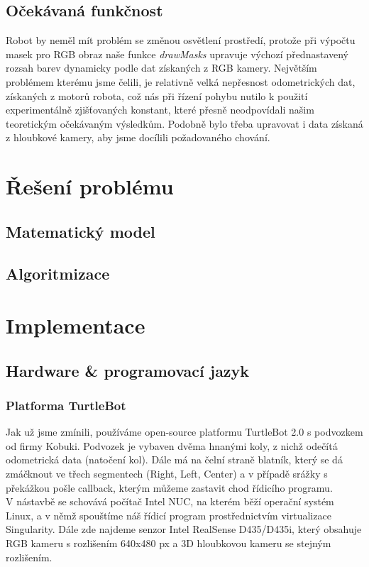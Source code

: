 \documentclass{article}
\begin{document}
	\subsection{Očekávaná funkčnost}
	Robot by neměl mít problém se změnou osvětlení prostředí, protože při výpočtu masek pro RGB obraz naše funkce \textit{drawMasks} upravuje výchozí přednastavený rozsah barev dynamicky podle dat získaných z RGB kamery. Největším problémem kterému jsme čelili, je relativně velká nepřesnost odometrických dat, získaných z motorů robota, což nás při řízení pohybu nutilo k použití experimentálně zjišťovaných konstant, které přesně neodpovídali našim teoretickým očekávaným výsledkům. Podobně bylo třeba upravovat i data získaná z hloubkové kamery, aby jsme docílili požadovaného chování.
	
\section{Řešení problému}
	
	\subsection{Matematický model}
	
	\subsection{Algoritmizace}
	
\section{Implementace}

	\subsection{Hardware \& programovací jazyk} \label{ssec:6}
		
		\subsubsection{Platforma TurtleBot} \label{sssec:1}
		Jak už jsme zmínili, používáme open-source platformu TurtleBot 2.0 s podvozkem od firmy Kobuki. Podvozek je vybaven dvěma hnanými koly, z nichž odečítá odometrická data (natočení kol). Dále má na čelní straně blatník, který se dá zmáčknout ve třech segmentech (Right, Left, Center) a v případě srážky s překážkou pošle callback, kterým můžeme zastavit chod řídicího programu. \\
		V nástavbě se schovává počítač Intel NUC, na kterém běží operační systém Linux, a v němž spouštíme náš řídicí program prostřednictvím virtualizace Singularity. Dále zde najdeme senzor Intel RealSense D435/D435i, který obsahuje RGB kameru s rozlišením 640x480 px a 3D hloubkovou kameru se stejným rozlišením.
		
\end{document}
